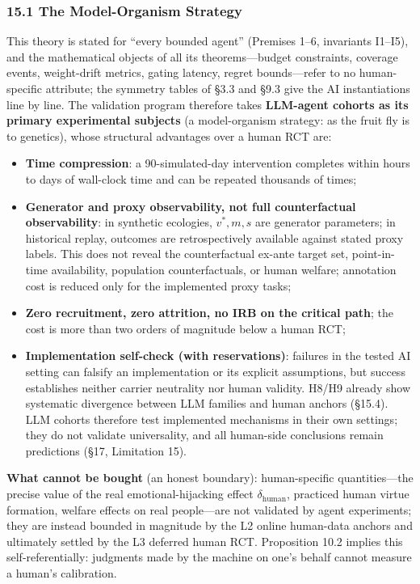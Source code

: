 \documentclass[
  11pt]{article}
\providecommand{\tightlist}{%
  \setlength{\itemsep}{0pt}\setlength{\parskip}{0pt}}
\begin{document}
\subsubsection{15.1 The Model-Organism
Strategy}\label{the-model-organism-strategy}

This theory is stated for ``every bounded agent'' (Premises 1--6,
invariants I1--I5), and the mathematical objects of all its
theorems---budget constraints, coverage events, weight-drift metrics,
gating latency, regret bounds---refer to no human-specific attribute;
the symmetry tables of §3.3 and §9.3 give the AI instantiations line by
line. The validation program therefore takes \textbf{LLM-agent cohorts
as its primary experimental subjects} (a model-organism strategy: as the
fruit fly is to genetics), whose structural advantages over a human RCT
are:

\begin{itemize}
\tightlist
\item
  \textbf{Time compression}: a 90-simulated-day intervention completes
  within hours to days of wall-clock time and can be repeated thousands
  of times;
\item
  \textbf{Generator and proxy observability, not full counterfactual
  observability}: in synthetic ecologies, \(v^*,m,s\) are generator
  parameters; in historical replay, outcomes are retrospectively
  available against stated proxy labels. This does not reveal the
  counterfactual ex-ante target set, point-in-time availability,
  population counterfactuals, or human welfare; annotation cost is
  reduced only for the implemented proxy tasks;
\item
  \textbf{Zero recruitment, zero attrition, no IRB on the critical
  path}; the cost is more than two orders of magnitude below a human
  RCT;
\item
  \textbf{Implementation self-check (with reservations)}: failures in
  the tested AI setting can falsify an implementation or its explicit
  assumptions, but success establishes neither carrier neutrality nor
  human validity. H8/H9 already show systematic divergence between LLM
  families and human anchors (§15.4). LLM cohorts therefore test
  implemented mechanisms in their own settings; they do not validate
  universality, and all human-side conclusions remain predictions (§17,
  Limitation 15).
\end{itemize}

\textbf{What cannot be bought} (an honest boundary): human-specific
quantities---the precise value of the real emotional-hijacking effect
\(\delta_{\mathrm{human}}\), practiced human virtue formation, welfare
effects on real people---are not validated by agent experiments; they
are instead bounded in magnitude by the L2 online human-data anchors and
ultimately settled by the L3 deferred human RCT. Proposition 10.2
implies this self-referentially: judgments made by the machine on one's
behalf cannot measure a human's calibration.
\end{document}
